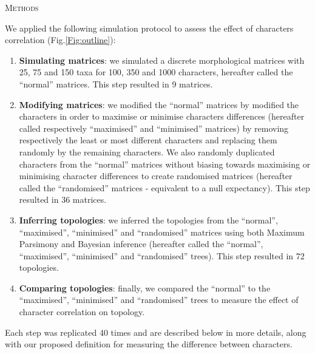 \documentclass[12pt,letterpaper]{article}
\renewcommand{\section}[1]{%
\bigskip
\begin{center}
\begin{Large}
\normalfont\scshape #1
\medskip
\end{Large}
\end{center}}
\begin{document}
\section{Methods}

We applied the following simulation protocol to assess the effect of characters correlation (Fig.\ref{Fig:outline}):
\begin{enumerate}
    \item \textbf{Simulating matrices}: we simulated a discrete morphological matrices with 25, 75 and 150 taxa for 100, 350 and 1000 characters, hereafter called the ``normal'' matrices. This step resulted in 9 matrices.
    \item \textbf{Modifying matrices}: we modified the ``normal'' matrices by modified the characters in order to maximise or minimise characters differences (hereafter called respectively ``maximised'' and ``minimised'' matrices) by removing respectively the least or most different characters and replacing them randomly by the remaining characters.
    We also randomly duplicated characters from the ``normal'' matrices without biasing towards maximising or minimising character differences to create randomised matrices (hereafter called the ``randomised'' matrices - equivalent to a null expectancy). This step resulted in 36 matrices.
    \item \textbf{Inferring topologies}: we inferred the topologies from the ``normal'', ``maximised'', ``minimised'' and ``randomised'' matrices using both Maximum Parsimony and Bayesian inference (hereafter called the ``normal'', ``maximised'', ``minimised'' and ``randomised'' trees). This step resulted in 72 topologies.
    \item \textbf{Comparing topologies}: finally, we compared the ``normal'' to the ``maximised'', ``minimised'' and ``randomised'' trees to measure the effect of character correlation on topology.
\end{enumerate}
Each step was replicated 40 times and are described below in more details, along with our proposed definition for measuring the difference between characters.
\end{document}
